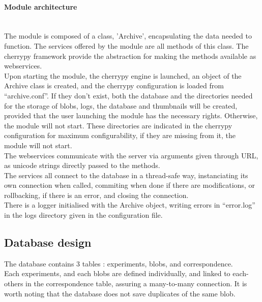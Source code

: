 \paragraph{Module architecture} \hspace{0pt} \\
The module is composed of a class, 'Archive', encapsulating the data needed to function. The services offered by the module are all methods of this class. The cherrypy framework provide the abstraction for making the methods available as webservices. \\
Upon starting the module, the cherrypy engine is launched, an object of the Archive class is created, and the cherrypy configuration is loaded from ``archive.conf''. If they don't exist, both the database and the directories needed for the storage of blobs, logs, the database and thumbnails will be created, provided that the user launching the module has the necessary rights. Otherwise, the module will not start. These directories are indicated in the cherrypy configuration for maximum configurability, if they are missing from it, the module will not start. \\
The webservices communicate with the server via arguments given through URL, as unicode strings directly passed to the methods. \\
The services all connect to the database in a thread-safe way, instanciating its own connection when called, commiting when done if there are modifications, or rollbacking, if there is an error, and closing the connection. \\
There is a logger initialised with the Archive object, writing errors in ``error.log'' in the logs directory given in the configuration file.

\subsection{Database design}

The database contains 3 tables : experiments, blobs, and correspondence.\\
Each experiments, and each blobs are defined individually, and linked to each-others in the correspondence table, assuring a many-to-many connection. It is worth noting that the database does not save duplicates of the same blob. \\


